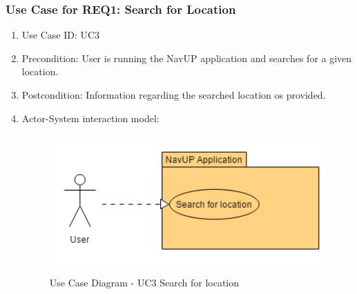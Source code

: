 \documentclass{article}
\begin{document}
		
		\newpage
		\subsubsection{Use Case for REQ1: Search for Location}
			\begin{enumerate}
			\renewcommand{\labelenumi}{{\textbf{\arabic{enumi}.}}}
			\item Use Case ID: UC3
			\item Precondition: User is running the NavUP application and searches for a given location.
			\item Postcondition: Information regarding  the searched location os provided.
			\item Actor-System interaction model:
				\graphicspath{ {./Diagrams/User/} }
				\begin{figure}[h]
				\caption{Use Case Diagram -  UC3  Search for location}
				\includegraphics[height = 200px]{SearchForLocation.png}
				\end{figure}
			\end{enumerate}
\end{document}
